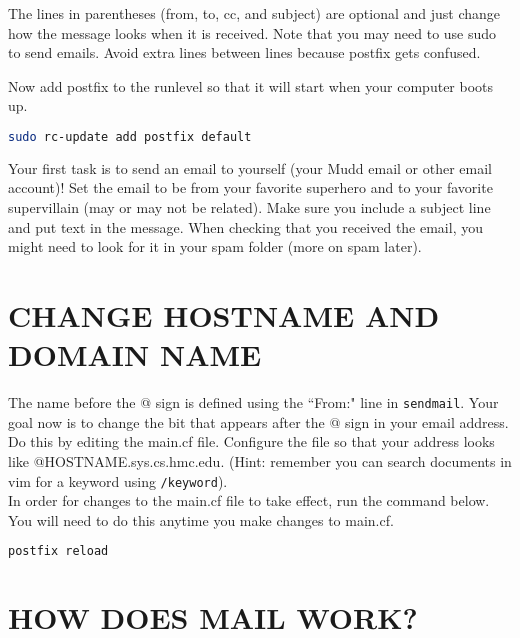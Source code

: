 \documentclass{article}
\begin{document}
\begin{enumerate}
The lines in parentheses (from, to, cc, and subject) are optional and just change how the message looks when it is received. Note that you may need to use sudo to send emails. Avoid extra lines between lines because postfix gets confused.

Now add postfix to the runlevel so that it will start when your computer boots up.

\begin{lstlisting}[basicstyle=\ttfamily, backgroundcolor = \color{lightgray}, language = bash, xleftmargin = 0cm, framexleftmargin = 1em]
sudo rc-update add postfix default
\end{lstlisting}

\end{enumerate}

Your first task is to send an email to yourself (your Mudd email or other email account)! Set the email to be from your favorite superhero and to your favorite supervillain (may or may not be related). Make sure you include a subject line and put text in the message. When checking that you received the email, you might need to look for it in your spam folder (more on spam later).



\section*{CHANGE HOSTNAME AND DOMAIN NAME}

\indent\indent The name before the @ sign is defined using the ``From:" line in \verb|sendmail|. Your goal now is to change the bit that appears after the @ sign in your email address. Do this by editing the main.cf file.  Configure the file so that your address looks like @HOSTNAME.sys.cs.hmc.edu. (Hint: remember you can search documents in vim for a keyword using \verb|/keyword|). \\

In order for changes to the main.cf file to take effect, run the command below. You will need to do this anytime you make changes to main.cf.

\begin{lstlisting}[basicstyle=\ttfamily, backgroundcolor = \color{lightgray}, language = bash, xleftmargin = 0cm, framexleftmargin = 1em]
postfix reload
\end{lstlisting}



\section*{HOW DOES MAIL WORK?}
\end{document}
